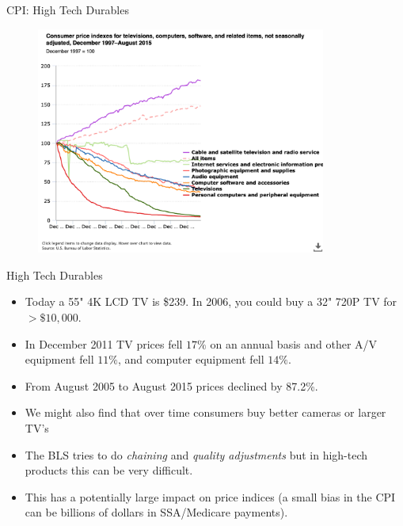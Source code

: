 \documentclass[xcolor=pdftex,dvipsnames,table,mathserif,aspectratio=169]{beamer}
\begin{document}
\begin{frame}{CPI: High Tech Durables}
\begin{figure}[htbp]
\begin{center}
\includegraphics[width=3.75in]{resources/cpi_chart.png}
\label{gandr2}
\end{center}
\end{figure}
\end{frame}


\begin{frame}{High Tech Durables}
\begin{itemize}
\item Today a 55" 4K LCD TV is \$239. In 2006, you could buy a 32" 720P TV for $>\$10,000$.
\item In December 2011 TV prices fell $17\%$ on an annual basis and other A/V equipment fell $11\%$, and computer equipment fell $14\%$.
\item From August 2005 to August 2015 prices declined by 87.2\%.
\item We might also find that over time consumers buy better cameras or larger TV's
\item The BLS tries to do \textit{chaining} and \textit{quality adjustments} but in high-tech products this can be very difficult.
\item This has a potentially large impact on price indices (a small bias in the CPI can be billions of dollars in SSA/Medicare payments).
\end{itemize}
\end{frame}
\end{document}
